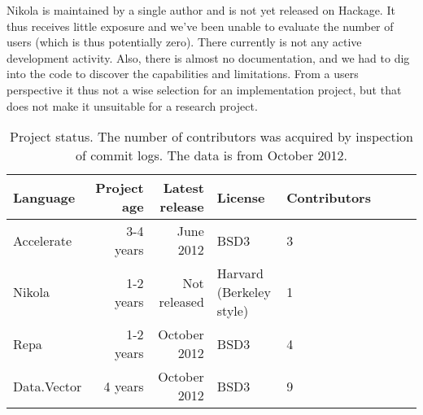 Nikola is maintained by a single author and is not yet released on
Hackage. It thus receives little exposure and we've been unable to
evaluate the number of users (which is thus potentially zero). There
currently is not any active development activity. Also, there is almost
no documentation, and we had to dig into the code to discover the
capabilities and limitations. From a users perspective it thus not a
wise selection for an implementation project, but that does not make
it unsuitable for a research project.


\begin{table}
  \centering
\begin{adjustbox}{minipage=1.1\textwidth,margin=0pt \smallskipamount,center}
  \begin{tabular}{l|rrllllr}
    Language    & Project age & Latest release & License & Contributors \\ \hline
    Accelerate  & 3-4 years   & June 2012      & BSD3    & 3 \\
    Nikola      & 1-2 years   & Not released   & Harvard (Berkeley style) & 1 \\
    Repa        & 1-2 years   & October 2012   & BSD3    & 4 \\
    Data.Vector & 4 years     & October 2012   & BSD3    & 9 \\
  \end{tabular}
  \caption{Project status. The number of contributors was acquired by
    inspection of commit logs. The data is from October 2012.}
\end{adjustbox}
\label{tab:project_status}
\end{table}








